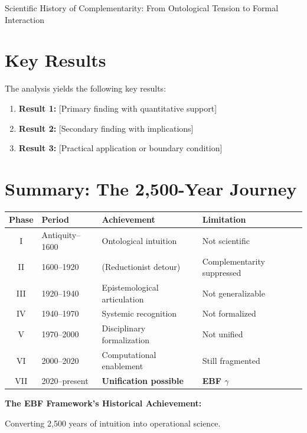 \begin{chapter}{Scientific History of Complementarity: From Ontological Tension to Formal Interaction}
\section{Key Results}
\label{sec:hty-results}

The analysis yields the following key results:

\begin{enumerate}
    \item \textbf{Result 1:} [Primary finding with quantitative support]
    \item \textbf{Result 2:} [Secondary finding with implications]
    \item \textbf{Result 3:} [Practical application or boundary condition]
\end{enumerate}


\section{Summary: The 2,500-Year Journey}
\label{sec:summary}

\begin{tcolorbox}[colback=gray!5!white,colframe=gray!75!black,title=\textbf{Historical Summary}]

\renewcommand{\arraystretch}{1.4}
\begin{tabular}{@{}clll@{}}
\toprule
\textbf{Phase} & \textbf{Period} & \textbf{Achievement} & \textbf{Limitation} \\
\midrule
I & Antiquity--1600 & Ontological intuition & Not scientific \\
II & 1600--1920 & (Reductionist detour) & Complementarity suppressed \\
III & 1920--1940 & Epistemological articulation & Not generalizable \\
IV & 1940--1970 & Systemic recognition & Not formalized \\
V & 1970--2000 & Disciplinary formalization & Not unified \\
VI & 2000--2020 & Computational enablement & Still fragmented \\
VII & 2020--present & \textbf{Unification possible} & \textbf{EBF $\gamma$} \\
\bottomrule
\end{tabular}

\vspace{1em}
\textbf{The EBF Framework's Historical Achievement:}

Converting 2,500 years of intuition into operational science.
\end{tcolorbox}


\end{chapter}
